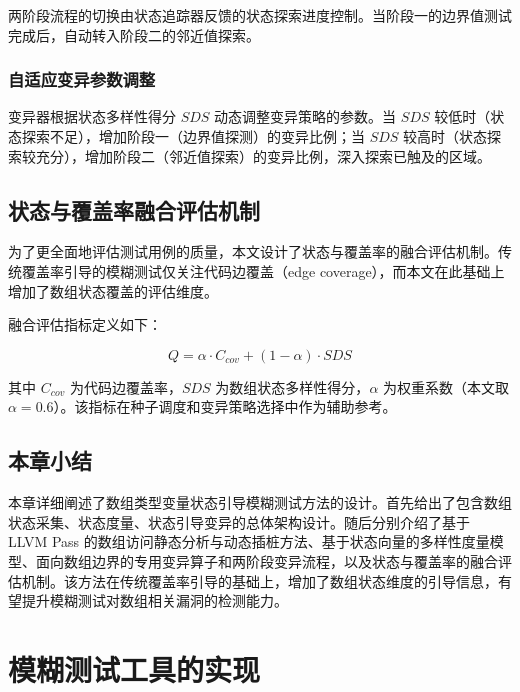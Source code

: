 \documentclass[bachelor]{njupthesis}
\begin{document}
两阶段流程的切换由状态追踪器反馈的状态探索进度控制。当阶段一的边界值测试完成后，自动转入阶段二的邻近值探索。

\subsection{自适应变异参数调整}

变异器根据状态多样性得分 $SDS$ 动态调整变异策略的参数。当 $SDS$ 较低时（状态探索不足），增加阶段一（边界值探测）的变异比例；当 $SDS$ 较高时（状态探索较充分），增加阶段二（邻近值探索）的变异比例，深入探索已触及的区域。

\section{状态与覆盖率融合评估机制}

为了更全面地评估测试用例的质量，本文设计了状态与覆盖率的融合评估机制。传统覆盖率引导的模糊测试仅关注代码边覆盖（edge coverage），而本文在此基础上增加了数组状态覆盖的评估维度。

融合评估指标定义如下：

\begin{equation}
Q = \alpha \cdot C_{cov} + (1 - \alpha) \cdot SDS
\end{equation}

其中 $C_{cov}$ 为代码边覆盖率，$SDS$ 为数组状态多样性得分，$\alpha$ 为权重系数（本文取 $\alpha = 0.6$）。该指标在种子调度和变异策略选择中作为辅助参考。

\section{本章小结}

本章详细阐述了数组类型变量状态引导模糊测试方法的设计。首先给出了包含数组状态采集、状态度量、状态引导变异的总体架构设计。随后分别介绍了基于 LLVM Pass 的数组访问静态分析与动态插桩方法、基于状态向量的多样性度量模型、面向数组边界的专用变异算子和两阶段变异流程，以及状态与覆盖率的融合评估机制。该方法在传统覆盖率引导的基础上，增加了数组状态维度的引导信息，有望提升模糊测试对数组相关漏洞的检测能力。

\chapter{模糊测试工具的实现}
\end{document}
